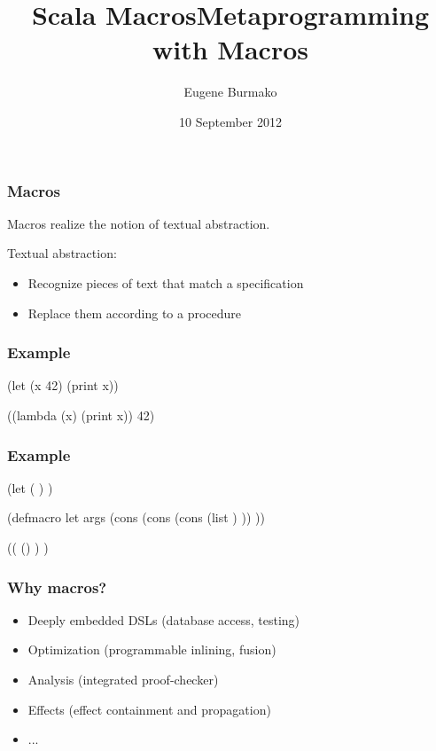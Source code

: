 \documentclass[hyperref={bookmarks=false}]{beamer}
\title{Scala Macros}
\begin{document}
\title{Metaprogramming with Macros}
\author{Eugene Burmako}
\date{10 September 2012}
{
\begin{frame}
  \titlepage
\end{frame}
}

\begin{frame}[fragile]
\frametitle{Macros}
\pause
Macros realize the notion of textual abstraction.

\pause
Textual abstraction:
\begin{itemize}
\item Recognize pieces of text that match a specification
\item Replace them according to a procedure
\end{itemize}
\end{frame}

\begin{frame}[fragile]
\frametitle{Example}
\begin{semiverbatim}
(let (x 42) (print x))








((lambda (x) (print x)) 42)
\end{semiverbatim}
\end{frame}

\begin{frame}[fragile]
\frametitle{Example}
\begin{semiverbatim}
(let (\text{\color{red}{x}} \text{\color{teal}{42}}) \text{\color{violet}{(print x)}})

(defmacro let args
  (cons
   (cons \text{\color{blue}{'lambda}}
         (cons (list \text{\color{red}{(caar args)}})
               \text{\color{violet}{(cdr args)}}))
   \text{\color{teal}{(cdar args)}}))

((\text{\color{blue}{lambda}} (\text{\color{red}{x}}) \text{\color{violet}{(print x)}}) \text{\color{teal}{42}})
\end{semiverbatim}
\end{frame}

\begin{frame}[fragile]
\frametitle{Why macros?}
\begin{itemize}
\item Deeply embedded DSLs (database access, testing)
\item Optimization (programmable inlining, fusion)
\item Analysis (integrated proof-checker)
\item Effects (effect containment and propagation)
\item ...
\end{itemize}
\end{frame}
\end{document}
